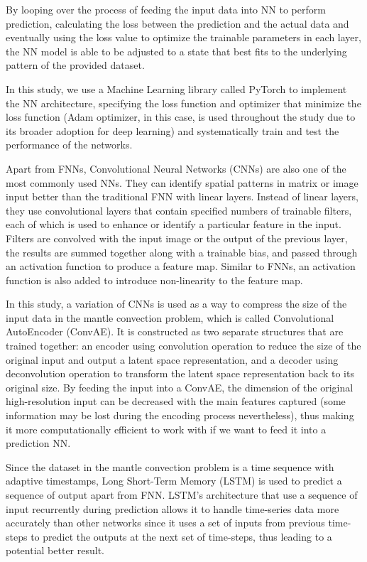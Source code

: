 By looping over the process of feeding the input data into NN to perform prediction, calculating the loss between the prediction and the actual data and eventually using the loss value to optimize the trainable parameters in each layer, the NN model is able to be adjusted to a state that best fits to the underlying pattern of the provided dataset.

In this study, we use a Machine Learning library called PyTorch to implement the NN architecture, specifying the loss function and optimizer that minimize the loss function (Adam optimizer, in this case, is used throughout the study due to its broader adoption for deep learning) and systematically train and test the performance of the networks.

Apart from FNNs, Convolutional Neural Networks (CNNs) are also one of the most commonly used NNs. They can identify 
spatial patterns in matrix or image input better than the traditional FNN with linear layers. Instead of linear layers, they use convolutional layers that contain specified numbers of trainable filters, each of which is used to enhance or identify a particular feature in the input. Filters are convolved with the input image or the output of the previous layer, the results are summed together along with a trainable bias, and passed through an activation function to produce a feature map. Similar to FNNs, an activation function is also added to introduce non-linearity to the feature map.

In this study, a variation of CNNs is used as a way to compress the size of the input data in the mantle convection problem, which is called Convolutional AutoEncoder (ConvAE). It is constructed as two separate structures that are trained together: an encoder using convolution operation to reduce the size of the original input and output a latent space representation, and a decoder using deconvolution operation to transform the latent space representation back to its original size. By feeding the input into a ConvAE, the dimension of the original high-resolution input can be decreased with the main features captured (some information may be lost during the encoding process nevertheless), thus making it more computationally efficient to work with if we want to feed it into a prediction NN.

Since the dataset in the mantle convection problem is a time sequence with adaptive timestamps, Long Short-Term Memory (LSTM) is used to predict a sequence of output apart from FNN. LSTM's architecture that use a sequence of input recurrently during prediction allows it to handle time-series data more accurately than other networks since it uses a set of inputs from previous time-steps to predict the outputs at the next set of time-steps, thus leading to a potential better result.


